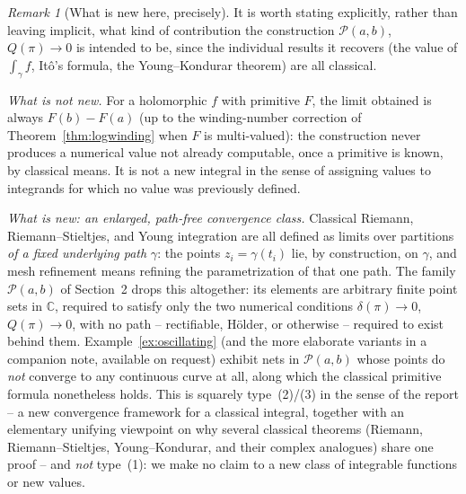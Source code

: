 \documentclass[11pt,fleqn]{article}
\def\C{\mathbb C}
\theoremstyle{plain}
\theoremstyle{remark}
\newtheorem{remark}[thm]{Remark}
\begin{document}
\begin{remark}[What is new here, precisely]\label{rem:novelty}
It is worth stating explicitly, rather than leaving implicit, what kind
of contribution the construction $\mathcal P(a,b)$, $Q(\pi)\to0$ is
intended to be, since the individual results it recovers (the value of
$\int_\gamma f$, It\^o's formula, the Young--Kondurar theorem) are all
classical.

\emph{What is not new.} For a holomorphic $f$ with primitive $F$, the
limit obtained is always $F(b)-F(a)$ (up to the winding-number
correction of Theorem~\ref{thm:logwinding} when $F$ is multi-valued): the construction
never produces a numerical value not already computable, once a
primitive is known, by classical means. It is not a new integral in the
sense of assigning values to integrands for which no value was
previously defined.

\emph{What is new: an enlarged, path-free convergence class.} Classical
Riemann, Riemann--Stieltjes, and Young integration are all defined as
limits over partitions \emph{of a fixed underlying path} $\gamma$: the
points $z_i=\gamma(t_i)$ lie, by construction, on $\gamma$, and mesh
refinement means refining the parametrization of that one path. The
family $\mathcal P(a,b)$ of Section~2 drops this altogether: its
elements are arbitrary finite point sets in $\C$, required to satisfy
only the two numerical conditions $\delta(\pi)\to0$, $Q(\pi)\to0$, with
no path -- rectifiable, H\"older, or otherwise -- required to exist
behind them. Example~\ref{ex:oscillating} (and the more elaborate variants in a
companion note, available on request) exhibit nets in $\mathcal P(a,b)$
whose points do \emph{not} converge to any continuous curve at all,
along which the classical primitive formula nonetheless holds. This is
squarely type~(2)/(3) in the sense of the report -- a new convergence
framework for a classical integral, together with an elementary
unifying viewpoint on why several classical theorems (Riemann,
Riemann--Stieltjes, Young--Kondurar, and their complex analogues) share
one proof -- and \emph{not} type~(1): we make no claim to a new class of
integrable functions or new values.


\end{remark}
\end{document}
